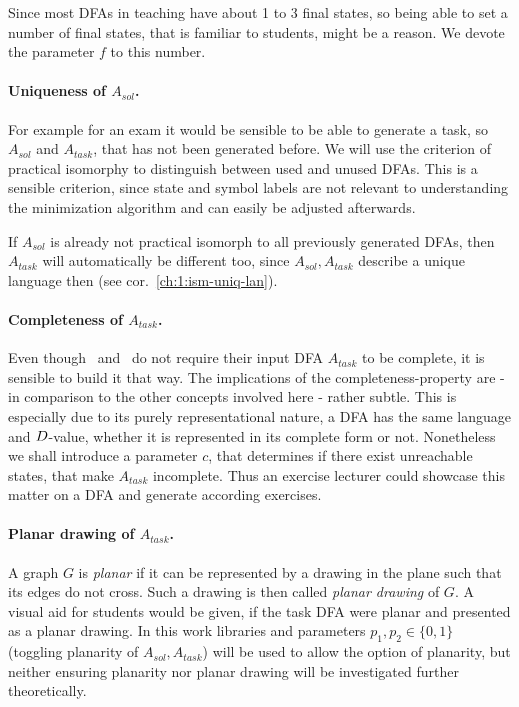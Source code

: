 Since most DFAs in teaching have about 1 to 3 final states, so being able to set a number of final states, that is familiar to students, might be a reason. We devote the parameter $f$ to this number.

\paragraph*{Uniqueness of $A_{sol}$.}

For example for an exam it would be sensible to be able to generate a task, so $A_{sol}$ and $A_{task}$, that has not been generated before. We will use the criterion of practical isomorphy to distinguish between used and unused DFAs. This is a sensible criterion, since state and symbol labels are not relevant to understanding the minimization algorithm and can easily be adjusted afterwards.

If $A_{sol}$ is already not practical isomorph to all previously generated DFAs, then $A_{task}$ will automatically be different too, since $A_{sol},A_{task}$ describe a unique language then (see cor.~\ref{ch:1:ism-uniq-lan}).

\paragraph*{Completeness of $A_{task}$.}

Even though \CompUnr\ and \RemUnr\ do not require their input DFA $A_{task}$ to be complete, it is sensible to build it that way. The implications of the completeness-property are - in comparison to the other concepts involved here - rather subtle. This is especially due to its purely representational nature, a DFA has the same language and $D$-value, whether it is represented in its complete form or not. Nonetheless we shall introduce a parameter $c$, that determines if there exist unreachable states, that make $A_{task}$ incomplete. Thus an exercise lecturer could showcase this matter on a DFA and generate according exercises.

\paragraph*{Planar drawing of $A_{task}$.}

A graph $G$ is \emph{planar} if it can be represented by a drawing in the plane such that its edges do not cross. Such a drawing is then called \emph{planar drawing} of $G$. A visual aid for students would be given, if the task DFA were planar and presented as a planar drawing. In this work libraries and parameters $p_1, p_2 \in \{0,1\}$ (toggling planarity of $A_{sol}, A_{task}$) will be used to allow the option of planarity, but neither ensuring planarity nor planar drawing will be investigated further theoretically.

